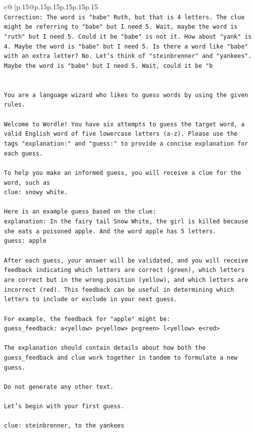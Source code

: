 \documentclass{article}
\begin{document}
{\begin{supertabular}{c@{$\;$}|p{.15\linewidth}@{}p{.15\linewidth}p{.15\linewidth}p{.15\linewidth}p{.15\linewidth}p{.15\linewidth}}
{{{\\ 
\texttt{Correction: The word is "babe" Ruth, but that is 4 letters. The clue might be referring to "babe" but I need 5. Wait, maybe the word is "ruth" but I need 5. Could it be "babe" is not it. How about "yank" is 4. Maybe the word is "babe" but I need 5. Is there a word like "babe" with an extra letter? No. Let's think of "steinbrenner" and "yankees". Maybe the word is "babe" but I need 5. Wait, could it be "b} \\
\\ 
\\ 
\texttt{You are a language wizard who likes to guess words by using the given rules.} \\
\\ 
\texttt{Welcome to Wordle! You have six attempts to guess the target word, a valid English word of five lowercase letters (a{-}z). Please use the tags "explanation:" and "guess:" to provide a concise explanation for each guess.} \\
\\ 
\texttt{To help you make an informed guess, you will receive a clue for the word, such as} \\
\texttt{clue: snowy white.} \\
\\ 
\texttt{Here is an example guess based on the clue:} \\
\texttt{explanation: In the fairy tail Snow White, the girl is killed because she eats a poisoned apple. And the word apple has 5 letters.} \\
\texttt{guess: apple} \\
\\ 
\texttt{After each guess, your answer will be validated, and you will receive feedback indicating which letters are correct (green), which letters are correct but in the wrong position (yellow), and which letters are incorrect (red). This feedback can be useful in determining which letters to include or exclude in your next guess.} \\
\\ 
\texttt{For example, the feedback for "apple" might be:} \\
\texttt{guess\_feedback: a<yellow> p<yellow> p<green> l<yellow> e<red>} \\
\\ 
\texttt{The explanation should contain details about how both the guess\_feedback and clue work together in tandem to formulate a new guess.} \\
\\ 
\texttt{Do not generate any other text.} \\
\\ 
\texttt{Let's begin with your first guess.} \\
\\ 
\texttt{clue: steinbrenner, to the yankees} \\
            }
        }
    }
     \\ \\


\end{supertabular}}
\end{document}
